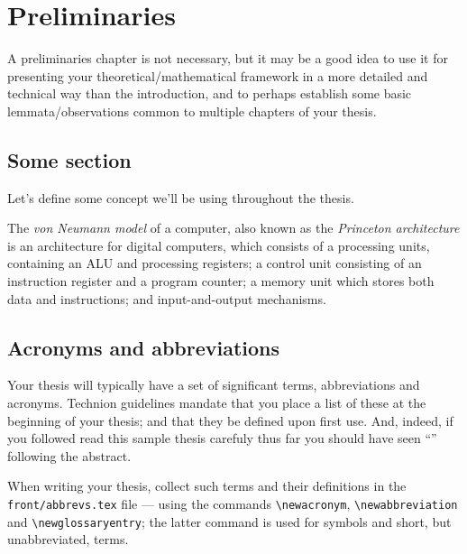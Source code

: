 \chapter{Preliminaries}
\label{chap:prelims}

A preliminaries chapter is not necessary, but it may be a good idea to use it for presenting your theoretical/mathematical framework in a more detailed and technical way than the introduction, and to perhaps establish some basic lemmata/observations common to multiple chapters of your thesis.

\section{Some section}

Let's define some concept we'll be using throughout the thesis.

\begin{definition}
The \emph{von Neumann model} of a computer, also known as the \emph{Princeton architecture} is an architecture for digital computers, which consists of a processing units, containing an ALU and processing registers; a control unit consisting of an instruction register and a program counter; a memory unit which stores both data and instructions; and input-and-output mechanisms.
\end{definition}

\section{Acronyms and abbreviations}

Your thesis will typically have a set of significant terms, abbreviations and acronyms. Technion guidelines mandate that you place a list of these at the beginning of your thesis; and that they be defined upon first use. And, indeed, if you followed read this sample thesis carefuly thus far you should have seen ``'' following the abstract.

When writing your thesis, collect such terms and their definitions in the \texttt{front/abbrevs.tex} file --- using the commands \verb|\newacronym|,  \verb|\newabbreviation| and \verb|\newglossaryentry|; the latter command is used for symbols and short, but unabbreviated, terms.

